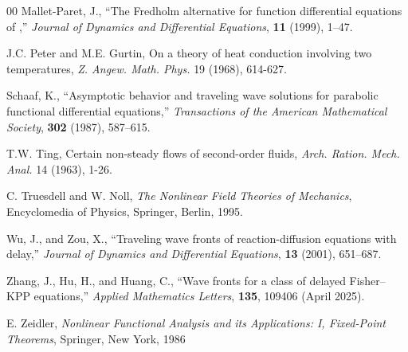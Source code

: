 \documentclass[12pt,letterpaper]{amsart}
\theoremstyle{definition}
\theoremstyle{remark}
\numberwithin{equation}{section}
\begin{document}
\begin{thebibliography}{00}
Mallet-Paret, J., ``The Fredholm alternative for function differential equations of ,'' \textit{Journal of Dynamics and Differential Equations}, \textbf{11} (1999), 1–47.
  
 J.C. Peter and M.E. Gurtin, On a theory of heat conduction involving two temperatures, {\it Z. Angew. Math. Phys. } 19 (1968), 614-627.








Schaaf, K., ``Asymptotic behavior and traveling wave solutions for parabolic functional differential equations,'' \textit{Transactions of the American Mathematical Society}, \textbf{302} (1987), 587–615.
















 T.W. Ting, Certain non-steady flows of second-order fluids, {\it Arch. Ration. Mech. Anal.} 14 (1963), 1-26.
 








 C. Truesdell and W. Noll, {\it The Nonlinear Field Theories of Mechanics}, Encyclomedia of Physics, Springer,  Berlin, 1995. 
 
Wu, J., and Zou, X., ``Traveling wave fronts of reaction-diffusion equations with delay,'' \textit{Journal of Dynamics and Differential Equations}, \textbf{13} (2001), 651–687.








Zhang, J., Hu, H., and Huang, C., ``Wave fronts for a class of delayed Fisher–KPP equations,'' \textit{Applied Mathematics Letters}, \textbf{135}, 109406 (April 2025).




E. Zeidler, \textit{Nonlinear Functional Analysis and its Applications: I, Fixed-Point Theorems}, Springer, New York, 1986
\end{thebibliography}
\end{document}
